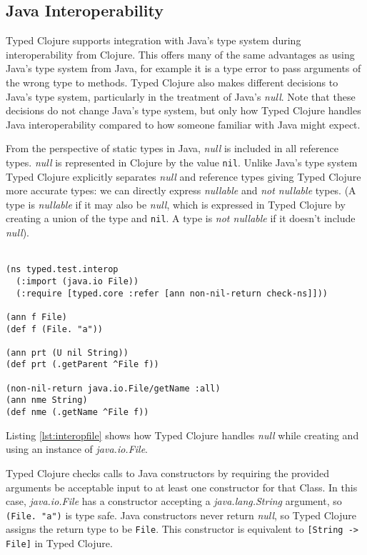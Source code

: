 \subsection{Java Interoperability}
\label{sec:javainterop}

Typed Clojure supports integration with Java's type system during
interoperability from Clojure. This offers many of the same advantages
as using Java's type system from Java, for example it is a type
error to pass arguments of the wrong type to methods.
Typed Clojure also makes different decisions to Java's type system,
particularly in the treatment of Java's \emph{null}.
Note that these decisions do not change Java's type system, but only
how Typed Clojure handles Java interoperability compared to how someone
familiar with Java might expect.

From the perspective of static types in Java, \emph{null} is included in all reference types.
\emph{null} is represented in Clojure by the value \lstinline|nil|. Unlike Java's type system
Typed Clojure explicitly separates \emph{null} and reference types giving Typed Clojure 
more accurate types: we can directly express \emph{nullable} and \emph{not nullable} types.
(A type is \emph{nullable} if it may also be \emph{null},
which is expressed in Typed Clojure by creating a union of the type and \lstinline|nil|.
A type is \emph{not nullable} if it doesn't include \emph{null}).
\\\\
\begin{lstlisting}[caption=Java interoperability with Typed Clojure, label=lst:interopfile]
(ns typed.test.interop
  (:import (java.io File))
  (:require [typed.core :refer [ann non-nil-return check-ns]]))

(ann f File)
(def f (File. "a"))

(ann prt (U nil String))
(def prt (.getParent ^File f))

(non-nil-return java.io.File/getName :all)
(ann nme String)
(def nme (.getName ^File f))

\end{lstlisting}

Listing \ref{lst:interopfile} shows how Typed Clojure handles \emph{null} while creating and
using an instance of \emph{java.io.File}.

Typed Clojure checks calls to Java constructors by requiring the provided
arguments be acceptable input to at least one constructor for that Class.
In this case, \emph{java.io.File} has a constructor accepting a \emph{java.lang.String}
argument, so \lstinline|(File. "a")| is type safe. Java constructors never
return \emph{null}, so Typed Clojure assigns the return type to be \lstinline|File|.
This constructor is equivalent to \lstinline|[String -> File]| in Typed Clojure.

